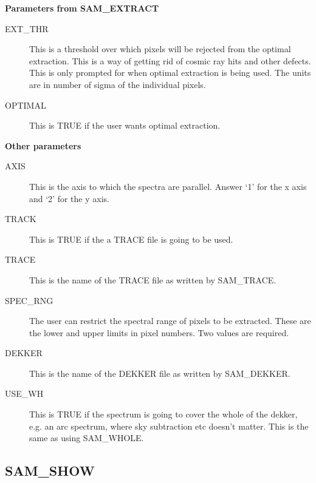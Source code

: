{\bf Parameters from SAM\_EXTRACT}

\begin{description}
\begin{description}

\item[EXT\_THR] This is a threshold over which pixels will be rejected from the
optimal extraction.  This is a way of getting rid of cosmic ray hits and other
defects.  This is only prompted for when optimal extraction is being used.  The
units are in number of sigma of the individual pixels.

\item[OPTIMAL]  This is TRUE if the user wants optimal extraction.  

\end{description}
\end{description}

{\bf Other parameters}

\begin{description}
\begin{description}

\item[AXIS] This is the axis to which the spectra are parallel.  Answer `1' for
the x axis and `2' for the y axis.

\item[TRACK] This is TRUE if the a TRACE file is going to be used.

\item[TRACE] This is the name of the TRACE file as written by SAM\_TRACE.

\item[SPEC\_RNG] The user can restrict the spectral range of pixels to be
extracted. These are the lower and upper limits in pixel numbers.  Two values
are required.

\item[DEKKER] This is the name of the DEKKER file as written by SAM\_DEKKER.

\item[USE\_WH] This is TRUE if the spectrum is going to cover the whole of the
dekker, e.g. an arc spectrum, where sky subtraction etc doesn't matter.  This
is the same as using SAM\_WHOLE.

\end{description}
\end{description}

\subsection{SAM\_SHOW}

